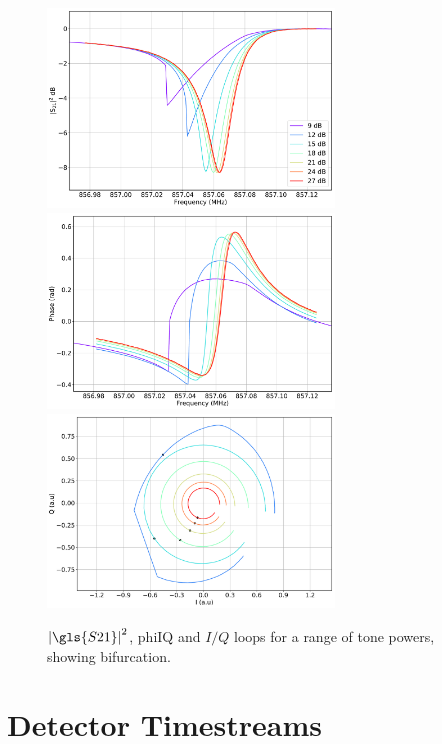 \begin{figure}[!ptbh]
\centering
\caption[~Sweeps at different tone powers for a single resonator, showing bifurcation.]{$\left| \gls{S21} \right|^{2}$, \gls{phiIQ} and $I/Q$ loops for a range of tone powers, showing bifurcation.}
\includegraphics[width=0.68\textwidth]{figures/blast_data/sweeps/mag_tone_power_bifurc}
\includegraphics[width=0.68\textwidth]{figures/blast_data/sweeps/phase_tone_power_bifurc}
\includegraphics[width=0.68\textwidth]{figures/blast_data/sweeps/IQ_tone_power_bifurc}
\label{fig:may out atten bifurc}
\end{figure}

\section{Detector Timestreams}\label{timestreams}

